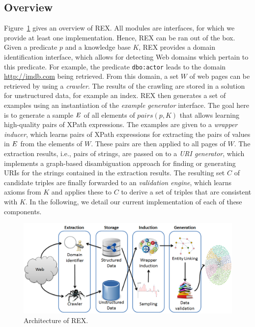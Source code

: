 \documentclass{llncs}
\newcommand{\examples}{\mbox{\ensuremath{E}}}
\begin{document}
\subsection{Overview}
Figure~\ref{fig:architecture} gives an overview of REX. 
All modules are interfaces, for which we provide at least one implementation.
Hence, REX can be ran out of the box.
Given a predicate $p$ and a knowledge base $K$, REX provides a domain identification interface, which allows for detecting Web domains which pertain to this predicate.
For example, the predicate \texttt{dbo:actor} leads to the domain \url{http://imdb.com} being retrieved.
From this domain,  a set $W$ of web pages can be retrieved by using a \emph{crawler}.
The results of the crawling are stored in a solution for unstructured data, for example an index. 
REX then generates a set of examples using an instantiation of the \emph{example generator} interface. 
The goal here is to generate a sample $\examples$ of all elements of $pairs(p, K)$ that allows learning high-quality pairs of XPath expressions. 
The examples are given to a \emph{wrapper inducer}, which learns pairs of XPath expressions for extracting the pairs of values in $\examples$ from the elements of $W$. 
These pairs are then applied to all pages of $W$.
The extraction results, i.e., pairs of strings, are passed on to a \emph{URI generator}, which implements a graph-based disambiguation approach for finding or generating URIs for the strings contained in the extraction results.
The resulting set $C$ of candidate triples are finally forwarded to an \emph{validation engine}, which learns axioms from $K$ and applies these to $C$ to derive a set of triples that are consistent with $K$. 
In the following, we detail our current implementation of each of these components.  

\begin{figure}[htb]
\centering
\includegraphics[width = \textwidth]{rexArchitecture}
\caption{Architecture of REX.}
\label{fig:architecture}
\end{figure}
\end{document}
